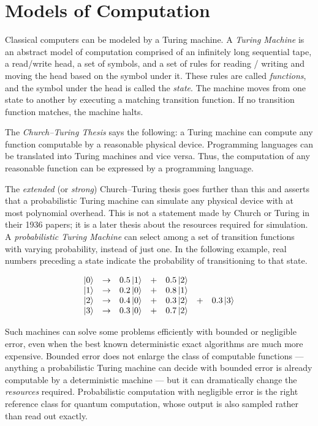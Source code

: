\setcounter{equation}{0}
\section{ Models of Computation}

Classical computers can be modeled by a Turing machine. A \emph{Turing Machine} is an abstract model of computation comprised of an infinitely long sequential tape, a read/write head, a set of symbols, and a set of rules for reading / writing and moving the head based on the symbol under it. These rules are called \emph{functions}, and the symbol under the head is called the \emph{state}. The machine moves from one state to another by executing a matching transition function. If no transition function matches, the machine halts.

The \emph{Church--Turing Thesis} \cite{ct36, tt36} says the following: a Turing machine can compute any function computable by a reasonable physical device. Programming languages can be translated into Turing machines and vice versa. Thus, the computation of any reasonable function can be expressed by a programming language.

The \emph{extended} (or \emph{strong}) Church--Turing thesis goes further than this and asserts that a probabilistic Turing machine can simulate any physical device with at most polynomial overhead. This is not a statement made by Church or Turing in their 1936 papers; it is a later thesis about the resources required for simulation. A \emph{probabilistic Turing Machine} can select among a set of transition functions with varying probability, instead of just one. In the following example, real numbers preceding a state indicate the probability of transitioning to that state.

\[ \begin{array}{ccccccc}
\mathinner{|{0}\rangle} & \rightarrow & 0.5\mathinner{|{1}\rangle} & + & 0.5\mathinner{|{2}\rangle} \\
\mathinner{|{1}\rangle} & \rightarrow & 0.2\mathinner{|{0}\rangle} & + & 0.8\mathinner{|{1}\rangle} \\
\mathinner{|{2}\rangle} & \rightarrow & 0.4\mathinner{|{0}\rangle} & + & 0.3\mathinner{|{2}\rangle} & + & 0.3\mathinner{|{3}\rangle} \\
\mathinner{|{3}\rangle} & \rightarrow & 0.3\mathinner{|{0}\rangle} & + & 0.7\mathinner{|{2}\rangle} \end{array}\] 

Such machines can solve some problems efficiently with bounded or negligible error, even when the best known deterministic exact algorithms are much more expensive. Bounded error does not enlarge the class of computable functions --- anything a probabilistic Turing machine can decide with bounded error is already computable by a deterministic machine --- but it can dramatically change the \emph{resources} required. Probabilistic computation with negligible error is the right reference class for quantum computation, whose output is also sampled rather than read out exactly.

